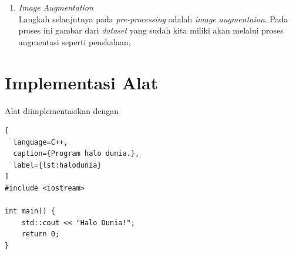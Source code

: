 \begin{enumerate}
	\item \textit{Image Augmentation}\\
	Langkah selanjutnya pada \textit{pre-processing} adalah \textit{image augmentaion}. Pada proses ini gambar dari \textit{dataset} yang sudah kita miliki akan melalui proses augmentasi seperti penskalaan,  
\end{enumerate}


\section{Implementasi Alat
\label{sec:implementasi alat}}

Alat diimplementasikan dengan \lipsum[1]

\begin{lstlisting}[
  language=C++,
  caption={Program halo dunia.},
  label={lst:halodunia}
]
#include <iostream>

int main() {
    std::cout << "Halo Dunia!";
    return 0;
}
\end{lstlisting}

\lipsum[2-3]



\lipsum[4]
